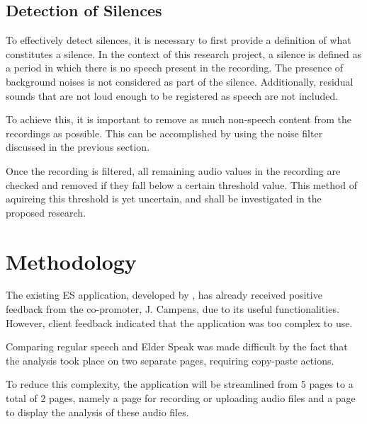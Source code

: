 \documentclass[english]{hogent-article}
\begin{document}
\subsection{Detection of Silences}
\label{subsec:detection-of-silences}

To effectively detect silences, it is necessary to first provide a definition of what constitutes a silence.
In the context of this research project, a silence is defined as a period in which there is no speech present in the recording.
The presence of background noises is not considered as part of the silence.
Additionally, residual sounds that are not loud enough to be registered as speech are not included.

\medskip

To achieve this, it is important to remove as much non-speech content from the recordings as possible.
This can be accomplished by using the noise filter discussed in the previous section.

\medskip

Once the recording is filtered, all remaining audio values in the recording are checked and removed if they fall below a certain threshold value.
This method of aquireing this threshold is yet uncertain, and shall be investigated in the proposed research.

\section{Methodology}%
\label{sec:methodology}


The existing ES application, developed by \cite{DeGussem2022}, has already received positive feedback from the co-promoter, J. Campens, due to its useful functionalities. However, client feedback indicated that the application was too complex to use.

Comparing regular speech and Elder Speak was made difficult by the fact that the analysis took place on two separate pages, requiring copy-paste actions.

To reduce this complexity, the application will be streamlined from 5 pages to a total of 2 pages, namely a page for recording or uploading audio files and a page to display the analysis of these audio files.
\end{document}
